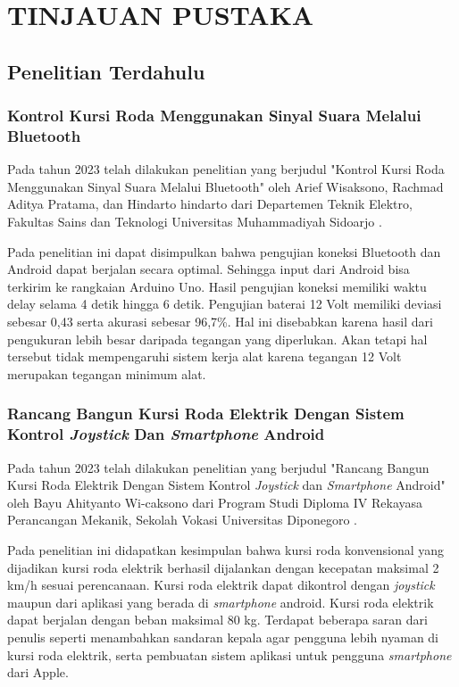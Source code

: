\chapter{TINJAUAN PUSTAKA}
\label{chap:tinjauanpustaka}


\section{Penelitian Terdahulu}
\label{sec:penelitianterdahulu}

\subsection{Kontrol Kursi Roda Menggunakan Sinyal Suara Melalui Bluetooth}

Pada tahun 2023 telah dilakukan penelitian yang berjudul "Kontrol Kursi Roda Menggunakan Sinyal Suara Melalui Bluetooth" oleh Arief Wisaksono, Rachmad Aditya Pratama, dan Hindarto hindarto dari Departemen Teknik Elektro, Fakultas Sains dan Teknologi Universitas Muhammadiyah Sidoarjo \parencite{wisaksono2023kontrol}.

Pada penelitian ini dapat disimpulkan bahwa pengujian koneksi Bluetooth dan Android dapat berjalan secara optimal. Sehingga input dari Android bisa terkirim ke rangkaian Arduino Uno. Hasil pengujian koneksi memiliki waktu delay selama 4 detik hingga 6 detik. Pengujian baterai 12 Volt memiliki deviasi sebesar 0,43 serta akurasi sebesar 96,7\%. Hal ini disebabkan karena hasil dari pengukuran lebih besar daripada tegangan yang diperlukan. Akan tetapi hal tersebut tidak mempengaruhi sistem kerja alat karena tegangan 12 Volt merupakan tegangan minimum alat.

\subsection{Rancang Bangun Kursi Roda Elektrik Dengan Sistem Kontrol \emph{Joystick} Dan \emph{Smartphone} Android}

Pada tahun 2023 telah dilakukan penelitian yang berjudul "Rancang Bangun Kursi Roda Elektrik Dengan Sistem Kontrol \emph{Joystick} dan \emph{Smartphone} Android" oleh Bayu Ahityanto Wi-caksono dari Program Studi Diploma IV Rekayasa Perancangan Mekanik, Sekolah Vokasi Universitas Diponegoro \parencite{wicaksono2023rancang}.

Pada penelitian ini didapatkan kesimpulan bahwa kursi roda konvensional yang dijadikan kursi roda elektrik berhasil dijalankan dengan kecepatan maksimal 2 km/h sesuai perencanaan. Kursi roda elektrik dapat dikontrol dengan \emph{joystick} maupun dari aplikasi yang berada di \emph{smartphone} android. Kursi roda elektrik dapat berjalan dengan beban maksimal 80 kg. Terdapat beberapa saran dari penulis seperti menambahkan sandaran kepala agar pengguna lebih nyaman di kursi roda elektrik, serta pembuatan sistem aplikasi untuk pengguna \emph{smartphone} dari Apple.

